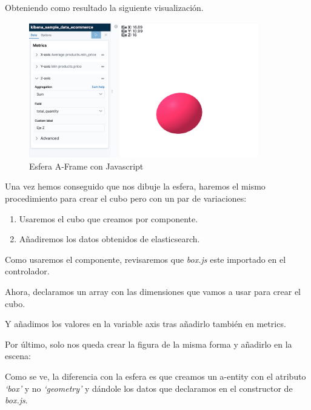 \documentclass[a4paper, 12pt]{book}
\begin{document}


Obteniendo como resultado la siguiente visualización.

\begin{figure}[H]
  \centering
  \includegraphics[width=10cm, keepaspectratio]{img/development/only_sphere.png}
  \caption{Esfera A-Frame con Javascript}
  \label{fig:onlysphere}
\end{figure}

Una vez hemos conseguido que nos dibuje la esfera, haremos el mismo procedimiento para crear el cubo pero con un par de variaciones:

\begin{enumerate}
    \item Usaremos el cubo que creamos por componente.
    \item Añadiremos los datos obtenidos de elasticsearch.
\end{enumerate}

Como usaremos el componente, revisaremos que \textit{box.js} este importado en el controlador.

Ahora, declaramos un array con las dimensiones que vamos a usar para crear el cubo. 



Y añadimos los valores en la variable axis tras añadirlo también en metrics.



Por último, solo nos queda crear la figura de la misma forma y añadirlo en la escena:



Como se ve, la diferencia con la esfera es que creamos un a-entity con el atributo \textit{`box'} y no \textit{`geometry'} y dándole los datos que declaramos en el constructor de \textit{box.js}.
\end{document}
